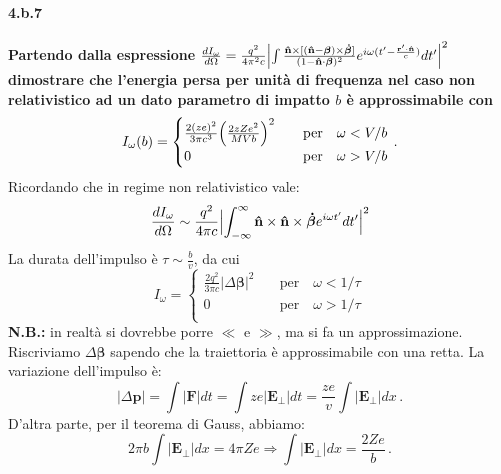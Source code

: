 \documentclass[twoside]{article}
\begin{document}
\paragraph{4.b.7}\textbf{Partendo dalla espressione $\frac{dI_\omega}{d\Omega}=\frac{q^2}{4\pi^2 c} \Bigl| \int \frac{\mathbf{\hat{n}}\times[(\mathbf{\hat{n}}-\bm{\beta})\times\bm{\dot{\beta}} ]}{(1-\mathbf{\hat{n}}\cdot\bm{\beta})^2} e^{i\omega ( t'-\frac{\mathbf{r'}\cdot\mathbf{\hat{n}}}{c} ) } dt' \Bigr|^2$ dimostrare che l'energia persa per unità di frequenza nel caso non relativistico ad un dato parametro di impatto $b$ è approssimabile con 
\begin{equation*}
I_\omega(b)=
\begin{cases}
\frac{2(ze)^2}{3\pi c^3} \Bigl( \frac{2zZe^2}{MVb} \Bigr)^2 \quad &\text{per} \quad \omega<V/b \\
0 &\text{per} \quad \omega>V/b \\ 
\end{cases} \, .
\end{equation*}}
Ricordando che in regime non relativistico vale:
\begin{equation}
    \frac{dI_\omega}{d\Omega}\sim \frac{q^2}{4\pi c} \Bigl| \int_{-\infty}^\infty\mathbf{\hat{n}}\times\mathbf{\hat{n}}\times\bm{\dot{\beta}} e^{i\omega t'} dt' \Bigr|^2
\end{equation}
La durata dell'impulso è $\tau\sim\frac{b}{v}$, da cui
\begin{equation*}
I_\omega=
\begin{cases}
\frac{2q^2}{3\pi c} |\Delta \bm{\beta}|^2 \quad &\text{per} \quad \omega<1/\tau \\
0 \quad &\text{per} \quad \omega>1/\tau  \\
\end{cases} 
\end{equation*}
\textbf{N.B.:} in realtà si dovrebbe porre $\ll$ e $\gg$, ma si fa un approssimazione.\\
Riscriviamo $\Delta \bm{\beta}$ sapendo che la traiettoria è approssimabile con una retta. La variazione dell'impulso è:
\begin{equation*}
|\Delta \mathbf{p}|=\int |\mathbf{F}| dt= \int ze |\mathbf{E_\bot}| dt= \frac{ze}{v} \int |\mathbf{E_\bot}| dx \, .
\end{equation*}
D'altra parte, per il teorema di Gauss, abbiamo:
\begin{equation*}
2\pi b \int |\mathbf{E_\bot}| dx= 4\pi Ze \Rightarrow \int |\mathbf{E_\bot}| dx= \frac{2Ze}{b}\, .
\end{equation*}
\end{document}
